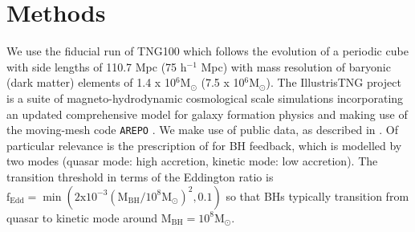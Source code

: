\documentclass[fleqn,usenatbib]{mnras}
\begin{document}
\section{Methods} \label{sec:methods}
We use the fiducial run of TNG100 which follows the evolution of a periodic cube with side lengths of 110.7 Mpc (75 h$^{-1}$ Mpc) with mass resolution of baryonic (dark matter) elements of 1.4 x 10$^6 \mathrm{M_{\odot}}$ (7.5 x 10$^6 \mathrm{M_{\odot}}$). The IllustrisTNG project \citep{marinacci18,naiman18,nelson18,pillepich18b,springel18} is a suite of magneto-hydrodynamic cosmological scale simulations incorporating an updated comprehensive model for galaxy formation physics \citep[][]{weinberger17,pillepich18a} and making use of the moving-mesh code \texttt{AREPO} \citep{springel10,pakmor11,pakmor13}. We make use of public data, as described in \citet{nelson2019}. Of particular relevance is the prescription of \citet{weinberger17} for BH feedback, which is modelled by two modes (quasar mode: high accretion, kinetic mode: low accretion). The transition threshold in terms of the Eddington ratio is $\mathrm{f_{Edd}= \min ( 2x10^{-3}(M_{BH}/10^8 M_{\odot})^2 , 0.1)}$ so that BHs typically transition from quasar to kinetic mode around $\mathrm{M_{BH} = 10^{8}M_{\odot}}$. 

\end{document}

